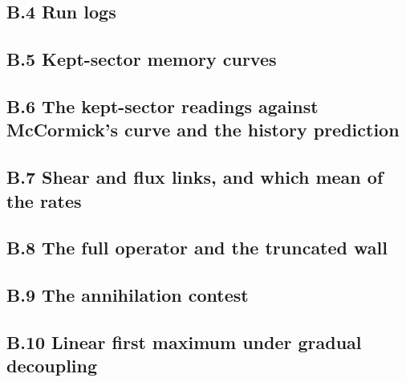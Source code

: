 \documentclass[11pt]{article}
\begin{document}
\subsection*{B.4 Run logs}






\subsection*{B.5 Kept-sector memory curves}


\subsection*{B.6 The kept-sector readings against McCormick's curve and the history prediction}





\subsection*{B.7 Shear and flux links, and which mean of the rates}




\subsection*{B.8 The full operator and the truncated wall}


\subsection*{B.9 The annihilation contest}


\subsection*{B.10 Linear first maximum under gradual decoupling}



\end{document}
